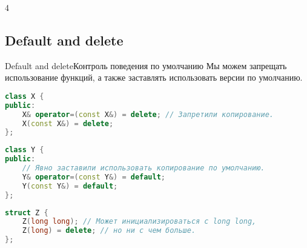4\documentclass[10pt]{beamer}
\begin{document}
\subsection{Default and delete}
\hypertarget{Default and delete}{}
\begin{frame}[fragile]{Default and delete}{Контроль поведения по умолчанию}
Мы можем запрещать использование функций, а также заставлять использовать версии по умолчанию.
\begin{lstlisting}[language=C++]
class X {
public:
    X& operator=(const X&) = delete; // Запретили копирование.
    X(const X&) = delete;
};
\end{lstlisting}
\begin{lstlisting}[language=C++]
class Y {
public:
    // Явно заставили использовать копирование по умолчанию.
    Y& operator=(const Y&) = default; 
    Y(const Y&) = default;
};
\end{lstlisting}
\begin{lstlisting}[language=C++]
struct Z {
    Z(long long); // Может инициализироваться с long long,
    Z(long) = delete; // но ни с чем больше.
};
\end{lstlisting}
\end{frame}
\end{document}
